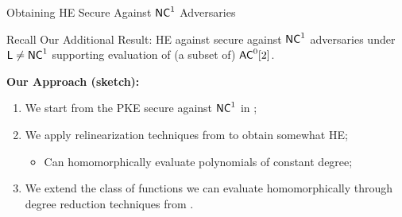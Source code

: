 \begin{frame}[t]{Obtaining HE Secure Against ${\mathsf{NC}}^1$ Adversaries}
\begin{block}{Recall Our Additional Result:}
	HE against secure against ${\mathsf{NC}}^1$ adversaries under ${\mathsf{L}} \not = {\mathsf{NC}}^1$ supporting evaluation of (a subset of) ${\mathsf{AC}}^0[2]$.
\end{block}
\pause
\bigskip
	\textbf{Our Approach (sketch):}
	\begin{enumerate}[<+- | alert@+>]
		\item We start from the PKE secure against ${\mathsf{NC}}^1$ in \cite{fgcrypto};
		\item We apply relinearization techniques from \cite{fhe-lwe} to obtain somewhat HE;
		\begin{itemize}
			\item Can homomorphically evaluate polynomials of constant degree; 
		\end{itemize}
		\item We extend the class of functions we can evaluate homomorphically through degree reduction techniques from \cite{razborov1987lower}.
	\end{enumerate}%
\end{frame}
